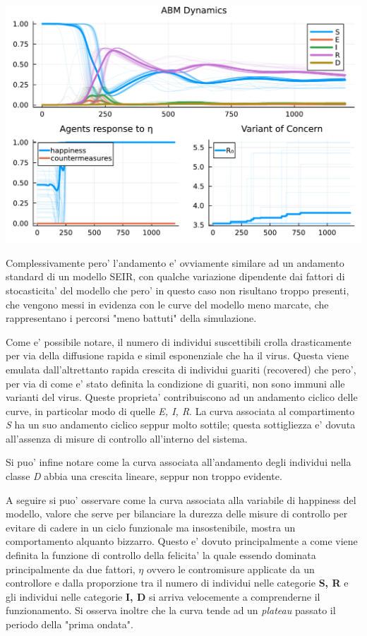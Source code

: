 \begin{minipage}{\linewidth}
	\centering
	\includegraphics[width=\textwidth]{img/SocialNetworkABM_NO_CONTROL.pdf}
	\label{fig:abm_no_intervent}
\end{minipage}

Complessivamente pero' l'andamento e' ovviamente similare ad un andamento standard di un modello 
SEIR, con qualche variazione dipendente dai fattori di stocasticita' del modello che pero'
in questo caso non risultano troppo presenti, che vengono messi in evidenza con le curve del modello 
meno marcate, che rappresentano i percorsi "meno battuti" della simulazione.

Come e' possibile notare, il numero di individui suscettibili crolla drasticamente
per via della diffusione rapida e simil esponenziale che ha il virus. Questa viene emulata
dall'altrettanto rapida crescita di individui guariti (recovered) che pero', per via
di come e' stato definita la condizione di guariti, non sono immuni alle varianti del virus. 
Queste proprieta' contribuiscono ad un andamento ciclico delle curve, in particolar modo 
di quelle \emph{E, I, R}. La curva associata al compartimento \emph{S} ha un suo andamento
ciclico seppur molto sottile; questa sottigliezza e' dovuta all'assenza di misure di 
controllo all'interno del sistema.

Si puo' infine notare come la curva associata all'andamento degli individui
nella classe \emph{D} abbia una crescita lineare, seppur non troppo evidente.

A seguire si puo' osservare come la curva associata alla variabile di happiness del modello,
valore che serve per bilanciare la durezza delle misure di controllo per evitare 
di cadere in un ciclo funzionale ma insostenibile, mostra un comportamento alquanto bizzarro.
Questo e' dovuto principalmente a come viene definita la funzione di controllo della felicita' 
la quale essendo dominata principalmente da due fattori, $\eta$ ovvero le contromisure applicate
da un controllore e dalla proporzione tra il numero di individui nelle categorie \textbf{S, R} e 
gli individui nelle categorie \textbf{I, D} si arriva velocemente a comprenderne il funzionamento.
Si osserva inoltre che la curva tende ad un \emph{plateau} passato il periodo della "prima ondata". 

